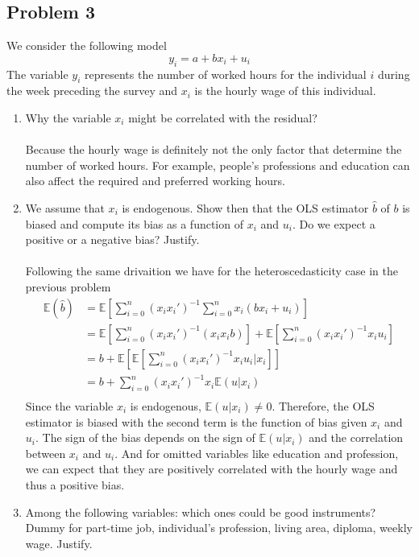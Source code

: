 \documentclass[12pt]{article}
\begin{document}
\begin{flushleft}
\subsection*{Problem 3}
We consider the following model
\[
y_i=a+bx_i+u_i
\]
The variable $y_i$ represents the number of worked hours for the individual $i$ during the week preceding the survey and $x_i$ is the hourly wage of this individual.
\begin{enumerate}
    \item Why the variable $x_i$ might be correlated with the residual?\\~\\
    Because the hourly wage is definitely not the only factor that determine the number of worked hours. For example, people's professions and education can also affect the required and preferred working hours.
    \item We assume that $x_i$ is endogenous. Show then that the OLS estimator $\hat{b}$ of $b$ is biased and compute its bias as a function of $x_i$ and $u_i$. Do we expect a positive or a negative bias? Justify.\\~\\
    Following the same drivaition we have for the heteroscedasticity case in the previous problem
    \begin{align*}
    \mathbb{E}(\hat{b}) &=\mathbb{E}\left[\sum_{i=0}^n(x_i x_i')^{-1}\sum_{i=0}^nx_i (bx_i+u_i)\right] \\
    &= \mathbb{E}\left[\sum_{i=0}^n(x_i x_i')^{-1}(x_i x_i b)\right]+\mathbb{E}\left[\sum_{i=0}^n(x_i x_i')^{-1}x_i u_i\right] \\
    &= b+\mathbb{E}\left[\mathbb{E}\left[\sum_{i=0}^n(x_i x_i')^{-1}x_i u_i | x_i \right]\right] \\
    &= b + \sum_{i=0}^n(x_i x_i')^{-1}x_i \mathbb{E}(u | x_i) \\
    \end{align*}
    Since the variable $x_i$ is endogenous, $\mathbb{E}(u | x_i) \neq 0$. Therefore, the OLS estimator is biased with the second term is the function of bias given $x_i$ and $u_i$. The sign of the bias depends on the sign of $\mathbb{E}(u | x_i)$ and the correlation between $x_i$ and $u_i$. And for omitted variables like education and profession, we can expect that they are positively correlated with the hourly wage and thus a positive bias.\\
    \item Among the following variables: which ones could be good instruments? Dummy for part-time job, individual’s profession, living area, diploma, weekly wage. Justify.\\~\\

\end{enumerate}
\end{flushleft}
\end{document}
